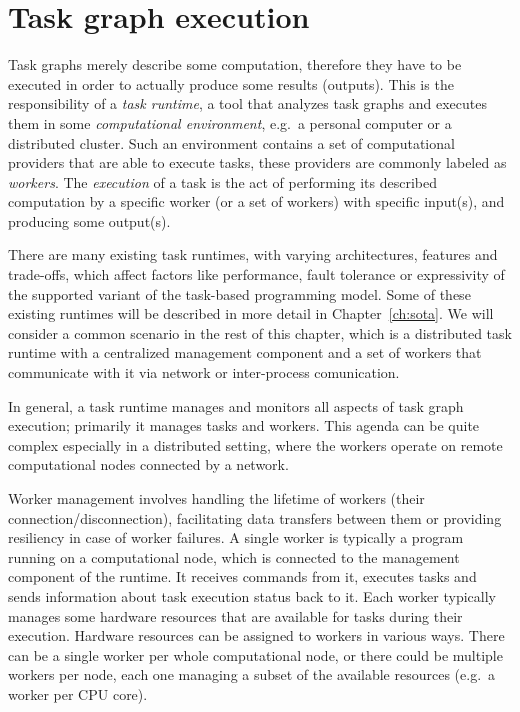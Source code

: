 \section{Task graph execution}
Task graphs merely describe some computation, therefore they have to be executed in order to
actually produce some results (outputs). This is the responsibility of a \emph{task runtime}, a
tool that analyzes task graphs and executes them in some \emph{computational environment}, e.g.\ a personal
computer or a distributed cluster. Such an environment contains a set of computational providers
that are able to execute tasks, these providers are commonly labeled as \emph{workers}. The
\emph{execution} of a task is the act of performing its described computation by a specific
worker (or a set of workers) with specific input(s), and producing some output(s).

There are many existing task runtimes, with varying architectures, features and trade-offs, which
affect factors like performance, fault tolerance or expressivity of the supported variant of the
task-based programming model. Some of these existing runtimes will be described in more detail in
Chapter~\ref{ch:sota}. We will consider a common scenario in the rest of this chapter,
which is a distributed task runtime with a centralized management component and a set of workers
that communicate with it via network or inter-process comunication.

In general, a task runtime manages and monitors all aspects of task graph execution; primarily it
manages tasks and workers. This agenda can be quite complex especially in a distributed setting,
where the workers operate on remote computational nodes connected by a network.

Worker management involves handling the lifetime of workers (their connection/disconnection),
facilitating data transfers between them or providing resiliency in case of worker failures. A
single worker is typically a program running on a computational node, which is connected to the
management component of the runtime. It receives commands from it, executes tasks and sends
information about task execution status back to it. Each worker typically manages some hardware
resources that are available for tasks during their execution. Hardware resources can be assigned
to workers in various ways. There can be a single worker per whole computational node, or there
could be multiple workers per node, each one managing a subset of the available resources (e.g.\ a
worker per CPU core).

